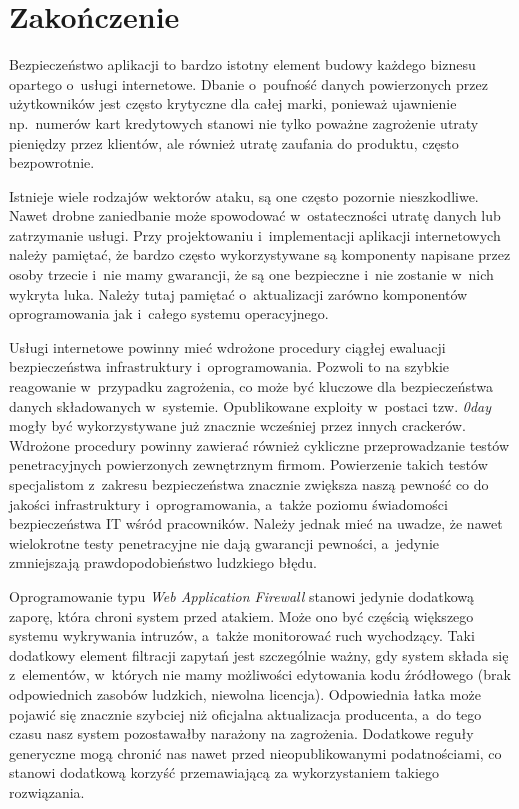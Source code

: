 \documentclass[12pt,a4paper,polish,thesis]{dcsbook}
\begin{document}
\FloatBarrier
\chapter{Zakończenie}
Bezpieczeństwo aplikacji to bardzo istotny element budowy każdego biznesu opartego o~usługi internetowe. Dbanie o~poufność danych powierzonych przez użytkowników jest często krytyczne dla całej marki, ponieważ ujawnienie np.~numerów kart kredytowych stanowi nie tylko poważne zagrożenie utraty pieniędzy przez klientów, ale również utratę zaufania do produktu, często bezpowrotnie.

Istnieje wiele rodzajów wektorów ataku, są one często pozornie nieszkodliwe. Nawet drobne zaniedbanie może spowodować w~ostateczności utratę danych lub zatrzymanie usługi. Przy projektowaniu i~implementacji aplikacji internetowych należy pamiętać, że bardzo często wykorzystywane są komponenty napisane przez osoby trzecie i~nie mamy gwarancji, że są one bezpieczne i~nie zostanie w~nich wykryta luka. Należy tutaj pamiętać o~aktualizacji zarówno komponentów oprogramowania jak i~całego systemu operacyjnego.

Usługi internetowe powinny mieć wdrożone procedury ciągłej ewaluacji bezpieczeństwa infrastruktury i~oprogramowania. Pozwoli to na szybkie reagowanie w~przypadku zagrożenia, co może być kluczowe dla bezpieczeństwa danych składowanych w~systemie. Opublikowane exploity w~postaci tzw. \textit{0day} mogły być wykorzystywane już znacznie wcześniej przez innych crackerów. Wdrożone procedury powinny zawierać również cykliczne przeprowadzanie testów penetracyjnych powierzonych zewnętrznym firmom. Powierzenie takich testów specjalistom z~zakresu bezpieczeństwa znacznie zwiększa naszą pewność co do jakości infrastruktury i~oprogramowania, a~także poziomu świadomości bezpieczeństwa IT wśród pracowników. Należy jednak mieć na uwadze, że nawet wielokrotne testy penetracyjne nie dają gwarancji pewności, a~jedynie zmniejszają prawdopodobieństwo ludzkiego błędu.

Oprogramowanie typu \textit{Web Application Firewall} stanowi jedynie dodatkową zaporę, która chroni system przed atakiem. Może ono być częścią większego systemu wykrywania intruzów, a~także monitorować ruch wychodzący. Taki dodatkowy element filtracji zapytań jest szczególnie ważny, gdy system składa się z~elementów, w~których nie mamy możliwości edytowania kodu źródłowego (brak odpowiednich zasobów ludzkich, niewolna licencja). Odpowiednia łatka może pojawić się znacznie szybciej niż oficjalna aktualizacja producenta, a~do tego czasu nasz system pozostawałby narażony na zagrożenia. Dodatkowe reguły generyczne mogą chronić nas nawet przed nieopublikowanymi podatnościami, co stanowi dodatkową korzyść przemawiającą za wykorzystaniem takiego rozwiązania.
\end{document}
